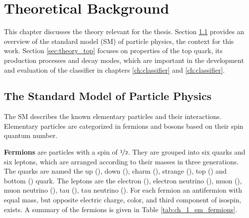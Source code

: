 \chapter{Theoretical Background}
\label{ch:theory}

This chapter discusses the theory relevant for the thesis. Section \ref{sec:theory_sm} provides an overview of the standard model (SM) of particle physics, the context for this work. Section \ref{sec:theory_top} focuses on properties of the top quark, its production processes and decay modes, which are important in the development and evaluation of the classifier in chapters \ref{ch:classifier} and \ref{ch:classifier}.
\section{The Standard Model of Particle Physics}
\label{sec:theory_sm}
The SM describes the known elementary particles and their interactions. Elementary particles are categorized in fermions and bosons based on their spin quantum number.

\textbf{Fermions} are particles with a spin of $\nicefrac{1}{2}$. They are grouped into six quarks and six leptons, which are arranged according to their masses in three generations. The quarks are named the up (\Pup), down (\Pdown), charm (\Pcharm), strange (\Pstrange), top (\Ptop) and bottom (\Pbottom) quark. The leptons are the electron (\Pe), electron neutrino (\Pelectronneutrino), muon (\Pmuon), muon neutrino (\Pmuonneutrino), tau (\Ptau), tau neutrino (\Ptauneutrino). For each fermion an antifermion with equal mass, but opposite electric charge, color, and third component of isospin, exists. A summary of the fermions is given in Table \ref{tab:ch_1_sm_fermions}.

